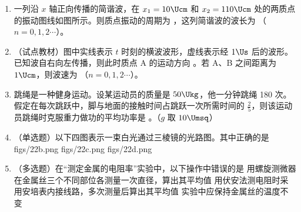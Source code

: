\documentclass[\gkver]{gaokaozhenti}
\begin{document}
\begin{enumerate}
\item
一列沿 $x$ 轴正向传播的简谐波，在 $x_{1} = 10\Ucm$ 和 $x_{2} = 110\Ucm$ 处的两质点的振动图线如图所示。则质点振动的周期为 \tkanswer[1.6cm]{$4\Us$}，这列简谐波的波长为 （$n = 0,1,2\cdots$）。
\onepicture[align=right, w=5.85cm]{}

\item
（试点教材）图中实线表示 $t$ 时刻的横波波形，虚线表示经 $1\Us$ 后的波形。已知波自右向左传播，则此时质点 A 的运动方向 。若 A、B 之间距离为 $1\Ucm$，则波速为 （$n = 0,1,2\cdots$）。
\onepicture[align=right, w=5.48cm]{}

\item
跳绳是一种健身运动。设某运动员的质量是 $50\Ukg$，他一分钟跳绳 180 次。假定在每次跳跃中，脚与地面的接触时间占跳跃一次所需时间的 $\frac{2}{5}$，则该运动员跳绳时克服重力做功的平均功率是 \tkanswer[1.8cm]{$75\UW$}。（$g$ 取 $10\Umsq$）
\jdanswer{
$75\UW$
}

\item
（单选题）以下四图表示一束白光通过三棱镜的光路图。其中正确的是
{figs/22b.png}
{figs/22c.png}
{figs/22d.png}

\item
（多选题）在“测定金属的电阻率”实验中，以下操作中错误的是
{用螺旋测微器在金属丝三个不同部位各测量一次直径，算出其平均值}
{用伏安法测电阻时采用安培表内接线路，多次测量后算出其平均值}
{实验中应保持金属丝的温度不变}


\end{enumerate}
\end{document}
